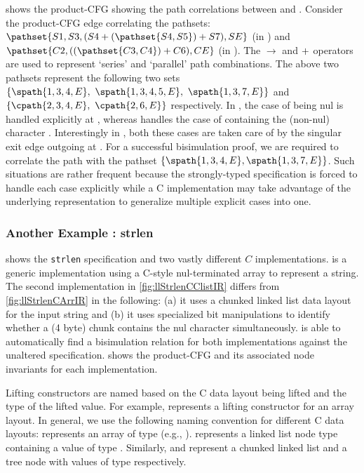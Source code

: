  shows the product-CFG showing the path correlations between \sprog{} and \cprog{}.
Consider the product-CFG edge  correlating the pathsets:
{\small $\pathset{S1,S3,(S4 \pathpar (\pathset{S4,S5}) \pathpar S7), SE}$} (in \sprog{}) and
{\small $\pathset{C2,((\pathset{C3,C4}) \pathpar C6),CE}$} (in \cprog{}).
The $\rightarrow$ and $+$ operators are used to represent `series' and `parallel' path combinations.
The above two pathsets represent the following two sets
{\small $\{ \spath{1,3,4,E},\ \spath{1,3,4,5,E},\ \spath{1,3,7,E} \}$} and
{\small $\{ \cpath{2,3,4,E},\ \cpath{2,6,E} \}$} respectively.
In \sprog{}, the case of  being nul is handled explicitly at , whereas
 handles the case of  containing the (non-nul) character .
Interestingly in \cprog{}, both these cases are taken care of by the singular exit edge outgoing at .
For a successful bisimulation proof, we are required to correlate the \cprog{} path
 with the \sprog{} pathset $\{ \spath{1,3,4,E}, \spath{1,3,7,E} \}$.
Such situations are rather frequent because the strongly-typed specification is forced to handle
each case explicitly while a C implementation may take advantage of the
underlying representation to generalize multiple explicit cases into one.




\subsubsection{Another Example : strlen}
 shows the {\tt strlen} specification and two vastly
different $C$ implementations.  is a generic implementation
using a C-style nul-terminated array to represent a string.
The second implementation in \cref{fig:llStrlenCClistIR} differs from \cref{fig:llStrlenCArrIR}
in the following: (a) it uses a chunked linked list data layout for the input string
and (b) it uses specialized bit manipulations to identify whether a (4 byte) chunk contains the nul character simultaneously.
\toolName{} is able to automatically find a bisimulation relation
for both implementations against the unaltered specification.
 shows the product-CFG and its associated node invariants for each implementation.

Lifting constructors are named based on the C data layout being lifted
and the type of the lifted value.
For example,  represents a  lifting constructor
for an array layout.
In general, we use the following naming convention for different C data layouts:
 represents an array of type  (e.g., ).
 represents a linked list node type containing a value of type .
Similarly,  and  represent a chunked linked list and a tree node
with values of type  respectively.

